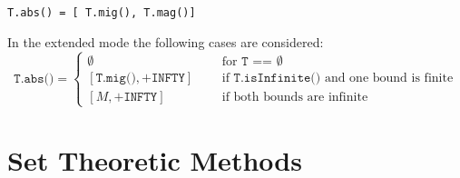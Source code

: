 \documentclass{report}
\newcommand{\INFTY}{\texttt{INFTY}}
\begin{document}
\begin{itemize}
				\begin{center}\texttt{T.abs() = [ T.mig(), T.mag()]}\end{center}
				In the extended mode the following
				cases are considered:
				\[
					\texttt{T.abs()} = \left\lbrace\begin{array}{lcl}
					\emptyset&\textrm{\ }&\textrm{for \ }\texttt{T == $\emptyset$} \\
					\texttt{}[\texttt{T.mig()},+\INFTY] &&\textrm{if\ } \texttt{T.isInfinite()}\textrm{ and one bound is finite}\\
					\texttt{}[M,+\INFTY]&&\textrm{if both bounds are infinite}
					\end{array}\right.
				\]
\end{itemize}
\section{Set Theoretic Methods}
\end{document}
